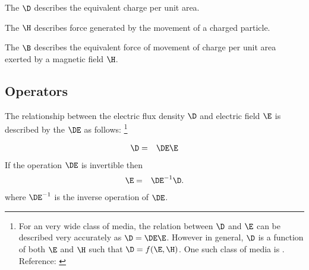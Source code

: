 \begin{definition}
\label{def_d}
The  $\D$ describes the equivalent charge per unit area.
\end{definition}


\begin{definition}
\label{def_h}
The  $\H$ describes force generated by the movement of a charged particle.
\end{definition}

\begin{definition}
\label{def_b}
The  $\B$ describes the equivalent force of movement of charge per unit area
exerted by a magnetic field $\H$.
\end{definition}


\subsection{Operators}
\begin{definition}
\label{def_de}
The relationship between the electric flux density $\D$
and electric field $\E$ is described by the  $\DE$
as follows:
\footnote{
   For an very wide class of media, the relation between $\D$ and $\E$
   can be described very accurately as $\D = \DE \E$.
   However in general, $\D$ is a function of both $\E$ and $\H$ such that
   $\D = f(\E,\H)$.
   One such class of media is .
   Reference: \cite[page 5]{kong}
   }

\begin{eqnarray*}
   \D &=& \DE\E
\end{eqnarray*}
If the operation $\DE$ is invertible then
\begin{eqnarray*}
   \E &=& \DE^{-1} \D.
\end{eqnarray*}
where $\DE^{-1}$ is the inverse operation of $\DE$.
\end{definition}

